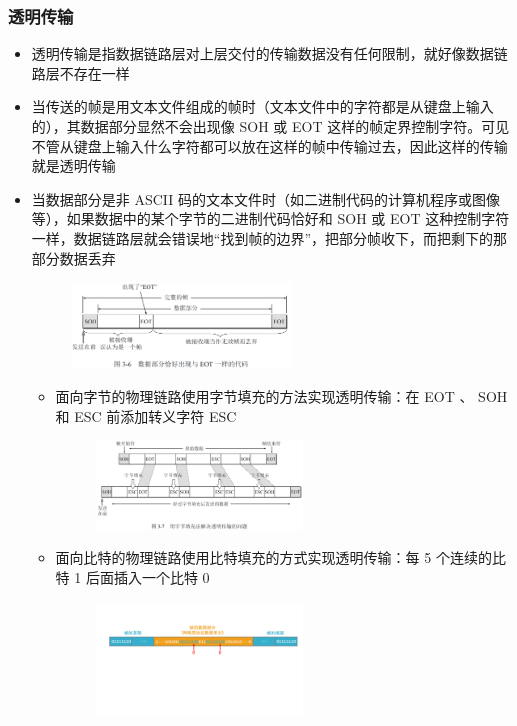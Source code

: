 \documentclass[cs4size,a4paper,10pt]{ctexart}
\begin{document}
	\subsubsection{透明传输}
	\begin{itemize}
		\item 透明传输是指数据链路层对上层交付的传输数据没有任何限制，就好像数据链路层不存在一样
		\item 当传送的帧是用文本文件组成的帧时（文本文件中的字符都是从键盘上输入的），其数据部分显然不会出现像 SOH 或 EOT 这样的帧定界控制字符。可见不管从键盘上输入什么字符都可以放在这样的帧中传输过去，因此这样的传输就是透明传输
		\item 当数据部分是非 ASCII 码的文本文件时（如二进制代码的计算机程序或图像等），如果数据中的某个字节的二进制代码恰好和 SOH 或 EOT 这种控制字符一样，数据链路层就会错误地“找到帧的边界”，把部分帧收下，而把剩下的那部分数据丢弃
		\begin{figure}[H]
			\centering
			\includegraphics[width=0.55\textwidth]{img/3.6}
		\end{figure}
		\begin{itemize}
			\item 面向字节的物理链路使用字节填充的方法实现透明传输：在 EOT 、 SOH 和 ESC 前添加转义字符 ESC
			\begin{figure}[H]
				\centering
				\includegraphics[width=0.55\textwidth]{img/3.7}
			\end{figure}
			\item 面向比特的物理链路使用比特填充的方式实现透明传输：每 5 个连续的比特 1 后面插入一个比特 0
			\begin{figure}[H]
				\centering
				\includegraphics[width=0.55\textwidth]{img/3.1.2}
			\end{figure}
		\end{itemize}
	\end{itemize}
\end{document}
